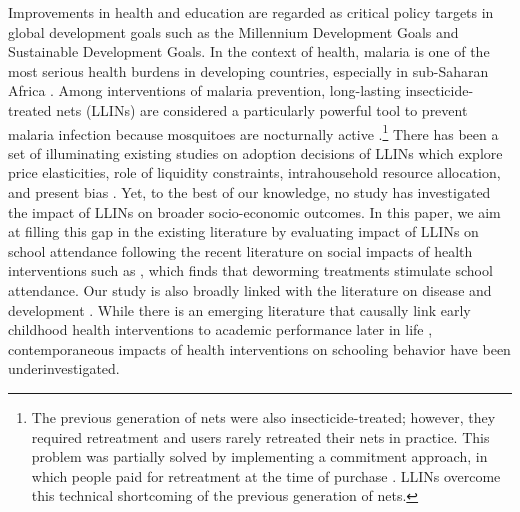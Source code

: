 \documentclass[fleqn,11pt]{article}
\begin{document}
Improvements in health and education are regarded as critical policy targets in global development goals such as the Millennium Development Goals and Sustainable Development Goals. In the context of health, malaria is one of the most serious health burdens in developing countries, especially in sub-Saharan Africa \citep{rowe_burden_2006}. Among interventions of malaria prevention, long-lasting insecticide-treated nets (LLINs) are considered a particularly powerful tool to prevent malaria infection because mosquitoes are nocturnally active \citep{lengeler_insecticide-treated_2006,sumitomo-chemical_olyset_2010,bhatt_effect_2015,pryce_insecticide-treated_2018,maskin_economics_2019}.\footnote{The previous generation of nets were also insecticide-treated; however, they required retreatment and users rarely retreated their nets in practice. This problem was partially solved by implementing a commitment approach, in which people paid for retreatment at the time of purchase \citep{tarozzi_micro-loans_2014}. LLINs overcome this technical shortcoming of the previous generation of nets.} There has been a set of illuminating existing studies on adoption decisions of LLINs which explore price elasticities, role of liquidity constraints, intrahousehold resource allocation, and present bias \citep{blackburn_bednets_2008,hoffmann_intrahousehold_2009,cohen_free_2010,tarozzi_micro-loans_2014,dupas_short-run_2014,mahajan_identification_2020}. Yet, to the best of our knowledge, no study has investigated the impact of LLINs on broader socio-economic outcomes. In this paper, we aim at filling this gap in the existing literature by evaluating impact of LLINs on school attendance following the recent literature on social impacts of health interventions such as \cite{miguel_worms:_2004}, which finds that deworming treatments stimulate school attendance. Our study is also broadly linked with the  literature on disease and development \citep{acemoglu_colonial_2001,bleakley_malaria_2010,almond_is_2006,alsan_effect_2015}. While there is an emerging literature that causally link early childhood health interventions to academic performance later in life \citep{field_iodine_2009,bharadwaj_early_2013}, contemporaneous impacts of health interventions on schooling behavior have been underinvestigated.
\end{document}
